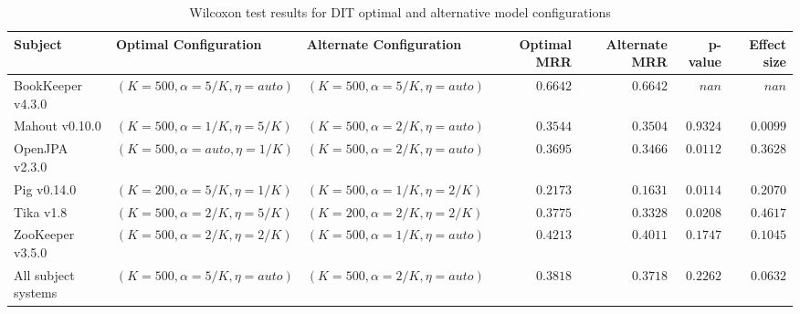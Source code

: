 \begin{landscape}
\begin{table}
\begin{spacing}{1.2}
\centering
\caption{Wilcoxon test results for DIT optimal and alternative model configurations}
\label{table:combo-dit-model-sweep-wilcox}
\begin{tabular}{lllrrrr}
\toprule
                      Subject &             Optimal Configuration &           Alternate Configuration & Optimal MRR & Alternate MRR &  p-value & Effect size \\
\midrule
            BookKeeper v4.3.0 &  $(K=500, \alpha=5/K, \eta=auto)$ &  $(K=500, \alpha=5/K, \eta=auto)$ &    $0.6642$ &      $0.6642$ &    $nan$ &       $nan$ \\
               Mahout v0.10.0 &   $(K=500, \alpha=1/K, \eta=5/K)$ &  $(K=500, \alpha=2/K, \eta=auto)$ &    $0.3544$ &      $0.3504$ & $0.9324$ &    $0.0099$ \\
               OpenJPA v2.3.0 &  $(K=500, \alpha=auto, \eta=1/K)$ &  $(K=500, \alpha=2/K, \eta=auto)$ &    $0.3695$ &      $0.3466$ & $0.0112$ &    $0.3628$ \\
                  Pig v0.14.0 &   $(K=200, \alpha=5/K, \eta=1/K)$ &   $(K=500, \alpha=1/K, \eta=2/K)$ &    $0.2173$ &      $0.1631$ & $0.0114$ &    $0.2070$ \\
                    Tika v1.8 &   $(K=500, \alpha=2/K, \eta=5/K)$ &   $(K=200, \alpha=2/K, \eta=2/K)$ &    $0.3775$ &      $0.3328$ & $0.0208$ &    $0.4617$ \\
             ZooKeeper v3.5.0 &   $(K=500, \alpha=2/K, \eta=2/K)$ &  $(K=500, \alpha=1/K, \eta=auto)$ &    $0.4213$ &      $0.4011$ & $0.1747$ &    $0.1045$ \\
 \midrule
All subject systems &  $(K=500, \alpha=5/K, \eta=auto)$ &  $(K=500, \alpha=2/K, \eta=auto)$ &    $0.3818$ &      $0.3718$ & $0.2262$ &    $0.0632$ \\
\bottomrule
\end{tabular}

\end{spacing}
\end{table}

\end{landscape}

